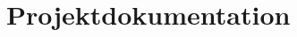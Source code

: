 \chapter{Projektdokumentation}

\begin{comment}
    Beschreibung der angepassten Projektmethode (Tailoring) auf 1-3 Seiten.
    Kurz begründen warum, weshalb und wie Anpassungen vorgenommen wurden.
\end{comment}

